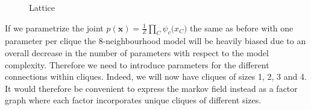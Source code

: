 \documentclass[11pt]{amsart}
\newcommand{\vek}[1]{\mathbf{#1}}
\begin{document}
\begin{figure}

\caption{Lattice}
\label{fig:lattice}
\end{figure}

If we parametrize the joint $p(\vek{x}) = \frac{1}{Z} \prod_C \psi_{c}\vek(x_C)$ the same as before with one parameter per clique the 8-neighbourhood model will be heavily biased due to an overall decrease in the number of parameters with respect to the model complexity. Therefore we need to introduce parameters for the different connections within cliques. Indeed, we will now have cliques of sizes 1, 2, 3 and 4. It would therefore be convenient to express the markov field instead as a factor graph where each factor incorporates unique cliques of different sizes. 
\end{document}
